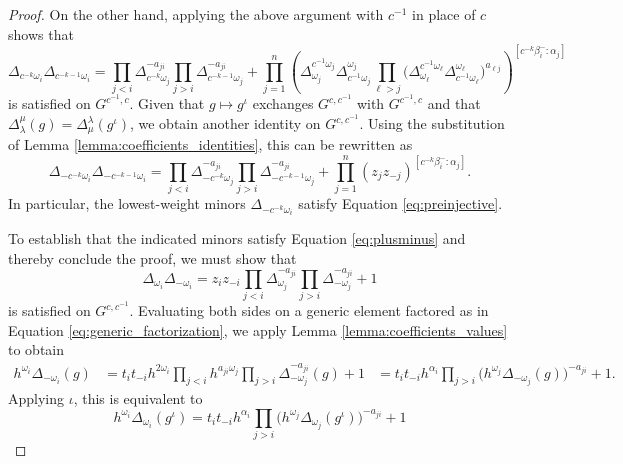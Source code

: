 \documentclass[12pt]{amsart}
\newcommand{\sayDR}[1]{\say[DR]{\color{red}{\bf DR:}\;#1}}
\theoremstyle{remark}
\numberwithin{equation}{section}
\begin{document}
\begin{proof}
On the other hand, applying the above argument with $c^{-1}$ in place of $c$ shows that  
\begin{equation*} \Delta_{c^{-k}\omega_i} \Delta_{c^{-k-1}\omega_i} = 
    \prod_{j<i}\Delta_{c^{-k}\omega_j}^{-a_{ji}}
    \prod_{j>i}\Delta_{c^{-k-1}\omega_j}^{-a_{ji}}
    +
    \prod_{j=1}^n\left( 
      \Delta^{c^{-1} \omega_j}_{\omega_j}
      \Delta^{\omega_j}_{ c^{-1}\omega_j} 
      \prod_{\ell>j}\big(
        \Delta^{c^{-1} \omega_\ell}_{\omega_\ell} 
        \Delta^{\omega_\ell}_{c^{-1} \omega_\ell}
      \big)^{a_{\ell j}}
    \right)^{[c^{-k}\beta_i^-:\alpha_j]}
\end{equation*}
is satisfied on $G^{c^{-1},c}$. Given that $g \mapsto g^\iota$ exchanges $G^{c,c^{-1}}$ with $G^{c^{-1},c}$ and that $\Delta_\lambda^\mu(g) = \Delta_\mu^\lambda(g^\iota)$, we obtain another identity on $G^{c,c^{-1}}$. Using the substitution of Lemma \ref{lemma:coefficients_identities}, this can be rewritten as
\begin{equation}
\Delta_{-c^{-k}\omega_i}\Delta_{-c^{-k-1}\omega_i} =
    \prod_{j<i}\Delta_{-c^{-k}\omega_j}^{-a_{ji}}
    \prod_{j>i}\Delta_{-c^{-k-1}\omega_j}^{-a_{ji}}
    +
    \prod_{j=1}^n (z_j z_{-j})^{[c^{-k}\beta_i^-:\alpha_j]}.
\end{equation}
In particular, the lowest-weight minors $\Delta_{-c^{-k}\omega_i}$ satisfy Equation \ref{eq:preinjective}.

To establish that the indicated minors satisfy Equation \ref{eq:plusminus} and thereby conclude the proof, we must show that
  \begin{equation*} 
\Delta_{\omega_i}\Delta_{-\omega_i} =
    z_i z_{-i}
    \prod_{j<i}\Delta_{\omega_j}^{-a_{ji}}
    \prod_{j>i}\Delta_{-\omega_j}^{-a_{ji}}
    +1
  \end{equation*}
  is satisfied on $G^{c,c^{-1}}$. Evaluating both sides on a generic element factored as in Equation \ref{eq:generic_factorization}, we apply Lemma \ref{lemma:coefficients_values} to obtain
  \begin{align*}
    h^{\omega_i}\Delta_{-\omega_i}(g)
    &=
    t_i
    t_{-i}
    h^{2\omega_i}
    \prod_{j<i}h^{a_{j i}\omega_j}
    \prod_{j>i}\Delta_{-\omega_j}^{-a_{ji}}(g)
    +
    1
    & = 
    t_i
    t_{-i}
    h^{\alpha_i}
    \prod_{j>i}\Big(h^{\omega_j}\Delta_{-\omega_j}(g)\Big)^{-a_{ji}}
    +
    1.
  \end{align*}
  Applying $\iota$, this is equivalent to  
  \begin{equation*}
    h^{\omega_i}\Delta_{\omega_i}(g^\iota) =
    t_i
    t_{-i}
    h^{\alpha_i}
    \prod_{j>i}\Big(h^{\omega_j}\Delta_{\omega_j}(g^\iota)\Big)^{-a_{ji}}
    +
    1
  \end{equation*}


\end{proof}
\end{document}
